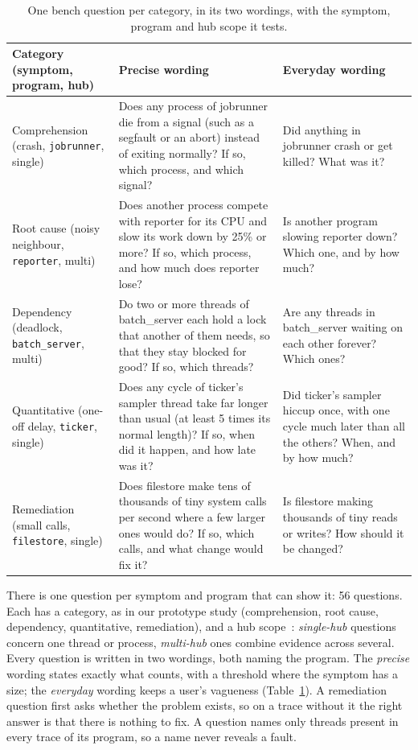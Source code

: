 \begin{table}[t]
\centering
\caption{One bench question per category, in its two wordings, with the symptom, program and hub scope it tests.}
\label{tab:questions}
\footnotesize
\setlength{\tabcolsep}{4pt}
\begin{tabularx}{\textwidth}{@{}>{\raggedright\arraybackslash}p{2.1cm}>{\raggedright\arraybackslash}X>{\raggedright\arraybackslash}p{5.2cm}@{}}
\toprule
Category (symptom, program, hub) & Precise wording & Everyday wording \\
\midrule
Comprehension (crash, \texttt{jobrunner}, single) & Does any process of jobrunner die from a signal (such as a segfault or an abort) instead of exiting normally? If so, which process, and which signal? & Did anything in jobrunner crash or get killed? What was it? \\
Root cause (noisy neighbour, \texttt{reporter}, multi) & Does another process compete with reporter for its CPU and slow its work down by 25\% or more? If so, which process, and how much does reporter lose? & Is another program slowing reporter down? Which one, and by how much? \\
Dependency (deadlock, \texttt{batch\_server}, multi) & Do two or more threads of batch\_server each hold a lock that another of them needs, so that they stay blocked for good? If so, which threads? & Are any threads in batch\_server waiting on each other forever? Which ones? \\
Quantitative (one-off delay, \texttt{ticker}, single) & Does any cycle of ticker's sampler thread take far longer than usual (at least 5 times its normal length)? If so, when did it happen, and how late was it? & Did ticker's sampler hiccup once, with one cycle much later than all the others? When, and by how much? \\
Remediation (small calls, \texttt{filestore}, single) & Does filestore make tens of thousands of tiny system calls per second where a few larger ones would do? If so, which calls, and what change would fix it? & Is filestore making thousands of tiny reads or writes? How should it be changed? \\
\bottomrule
\end{tabularx}
\end{table}


There is one question per symptom and program that can show it: 56 questions. Each has a category, as in our prototype study (comprehension, root cause, dependency, quantitative, remediation), and a hub scope~\cite{ezaz2026taaf}: \emph{single-hub} questions concern one thread or process, \emph{multi-hub} ones combine evidence across several. Every question is written in two wordings, both naming the program. The \emph{precise} wording states exactly what counts, with a threshold where the symptom has a size; the \emph{everyday} wording keeps a user's vagueness (Table~\ref{tab:questions}). A remediation question first asks whether the problem exists, so on a trace without it the right answer is that there is nothing to fix. A question names only threads present in every trace of its program, so a name never reveals a fault.

